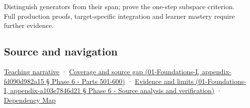 Distinguish generators from their span; prove the one-step subspace criterion. Full production proofs, target-specific integration and learner mastery require further evidence.

\subsection{Source and navigation}\label{source-and-navigation}

\href{Continuous\%20Notes/Computing\%20Foundations\%20-\%20From\%20Bits\%20to\%20C++\%20and\%20Systems\%20APIs\#The\%20reachable\%20movements\%20form\%20a\%20vector\%20space}{Teaching narrative} · \href{}{Coverage and source gap (01-Foundations-I, appendix-fd090d982a15 § Phase 6 - Parts 501-600)} · \href{}{Evidence and limits (01-Foundations-I, appendix-a103e7846d21 § Phase 6 - Source analysis and verification)} · \hyperref[appendix-4ad47bdd269a]{Dependency Map}
